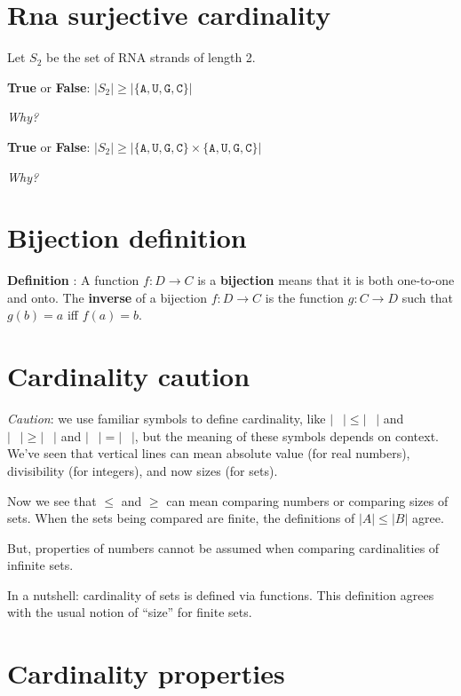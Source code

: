 \documentclass[12pt, oneside]{article}
\newcommand{\A}[0]{\texttt{A}}
\newcommand{\C}[0]{\texttt{C}}
\newcommand{\G}[0]{\texttt{G}}
\newcommand{\U}[0]{\texttt{U}}
\begin{document}
\section*{Rna surjective cardinality}


Let $S_2$ be the set of RNA strands of length 2.

{\bf True} or {\bf False}: $ |S_2 | \geq | \{\A,\U,\G,\C\} |$

{\it Why?}
\vspace{80pt}

{\bf True} or {\bf False}: $ |S_2 | \geq | \{\A,\U,\G,\C\} \times \{\A, \U, \G,\C\} |$

{\it Why?}
\vspace{80pt} \vfill
\section*{Bijection definition}


{\bf Definition} : A function $f: D  \to C$ is a {\bf bijection} means that it is both 
one-to-one  and onto. The {\bf inverse} of a  bijection $f: D  \to  C$ is 
the function $g: C  \to  D$  such that $g(b) = a$ iff  $f(a) =  b$.
 \vfill
\section*{Cardinality caution}


{\it Caution}: we use 
familiar symbols to define cardinality, like
$| \phantom{\cdots} | \leq | \phantom{\cdots} |$
and 
$| \phantom{\cdots} | \geq | \phantom{\cdots} |$
and 
$| \phantom{\cdots} | = | \phantom{\cdots} |$, 
but the meaning of these symbols depends on context.
We've seen that vertical lines can mean absolute
value (for real numbers), divisibility (for integers), 
and now sizes (for sets). 

Now we see that $\leq$ and $\geq$ can mean comparing
numbers or comparing sizes of sets. When the sets being 
compared are finite, the definitions 
of $|A| \leq |B|$ agree. 

But, properties of numbers cannot be assumed when comparing
cardinalities of infinite sets.

In a nutshell: cardinality of sets is defined via functions.
This definition agrees with the usual notion of ``size'' for 
finite sets. \vfill
\section*{Cardinality properties}
\end{document}
